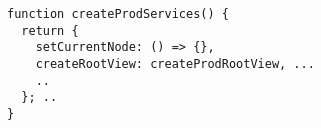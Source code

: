 \begin{verbatim}
function createProdServices() {
  return {
    setCurrentNode: () => {},
    createRootView: createProdRootView, ...
    ..
  }; ..
}
\end{verbatim}
